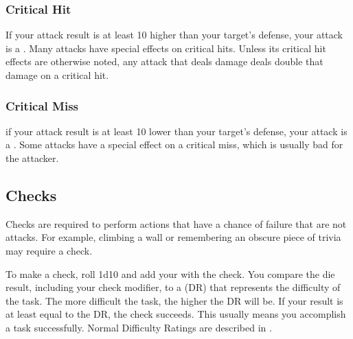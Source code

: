         \subsubsection{Critical Hit}\label{Critical Hit}
            If your attack result is at least 10 higher than your target's defense, your attack is a .
            Many attacks have special effects on critical hits.
            Unless its critical hit effects are otherwise noted, any attack that deals damage deals double that damage on a critical hit.

        \subsubsection{Critical Miss}\label{Critical Miss}
            if your attack result is at least 10 lower than your target's defense, your attack is a .
            Some attacks have a special effect on a critical miss, which is usually bad for the attacker.

    \subsection{Checks}\label{Checks}
        Checks are required to perform actions that have a chance of failure that are not attacks.
        For example, climbing a wall or remembering an obscure piece of trivia may require a check.

        To make a check, roll 1d10 and add your  with the check.
        You compare the die result, including your check modifier, to a  (DR) that represents the difficulty of the task.
        The more difficult the task, the higher the DR will be.
        If your result is at least equal to the DR, the check succeeds.
        This usually means you accomplish a task successfully.
        Normal Difficulty Ratings are described in .

